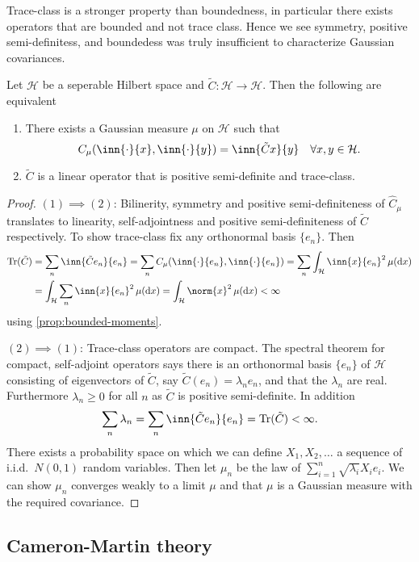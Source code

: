 \documentclass[fontsize=12pt, DIV=12]{scrreprt}
\newcommand{\calH}{\mathcal H}
\newcommand{\dif}[1]{\text{d} #1}
\DeclareMathOperator{\tr}{Tr}
\begin{document}
Trace-class is a stronger property than boundedness, in particular there exists operators that are bounded and not trace class. Hence we see symmetry, positive semi-definitess, and boundedess was truly insufficient to characterize Gaussian covariances.
\begin{prop}
	Let $\calH$ be a seperable Hilbert space and $\tilde{C}: \calH \to \calH$. Then the following are equivalent
	\begin{enumerate}
		\item There exists a Gaussian measure $\mu$ on $\calH$ such that
			\begin{equation}
				C_{\mu}(\inn{\cdot}{x}, \inn{\cdot}{y}) = \inn{\tilde{C} x}{y} \quad \forall x, y \in \calH.
			\end{equation}
		\item $\tilde{C}$ is a linear operator that is positive semi-definite and trace-class.
	\end{enumerate}
\end{prop}
\begin{proof}
	$(1) \implies (2)$: Bilinerity, symmetry and positive semi-definiteness of $\hat{C}_{\mu}$ translates to linearity, self-adjointness and positive semi-definiteness of $\tilde{C}$ respectively. To show trace-class fix any orthonormal basis $\{e_n\}$. Then
	\begin{align}
		\tr(\tilde{C})
		&= \sum_n \inn{\tilde{C}e_n}{e_n}
		= \sum_n C_{\mu}(\inn{\cdot}{e_n}, \inn{\cdot}{e_n})
		= \sum_n \int_{\calH} \inn{x}{e_n}^2 \, \mu(\dif x) \nonumber \\
		&= \int_{\calH} \sum_n \inn{x}{e_n}^2 \, \mu(\dif x)
		= \int_{\calH} \norm{x}^2 \, \mu(\dif x) < \infty
	\end{align}
	using \vref{prop:bounded-moments}.

	$(2) \implies (1)$: Trace-class operators are compact. The spectral theorem for compact, self-adjoint operators says there is an orthonormal basis $\{e_n\}$ of $\calH$ consisting of eigenvectors of $\tilde{C}$, say $\tilde{C}(e_n) = \lambda _n e_n$, and that the $\lambda_n$ are real. Furthermore $\lambda_n \geq 0$ for all $n$ as $\tilde{C}$ is positive semi-definite. In addition
	\begin{equation}
		\sum_n \lambda_n = \sum_n \inn{\tilde{C} e_n}{e_n} = \tr(\tilde{C}) < \infty.
	\end{equation}
	There exists a probability space on which we can define $X_1, X_2, \ldots$ a sequence of i.i.d.\ $N(0, 1)$ random variables. Then let $\mu_n$ be the law of $\sum_{i=1}^n \sqrt{\lambda_i} X_i e_i$. We can show $\mu_n$ converges weakly to a limit $\mu$ and that $\mu$ is a Gaussian measure with the required covariance.
\end{proof}

\subsection{Cameron-Martin theory}

\appendix



\printbibliography
\end{document}
